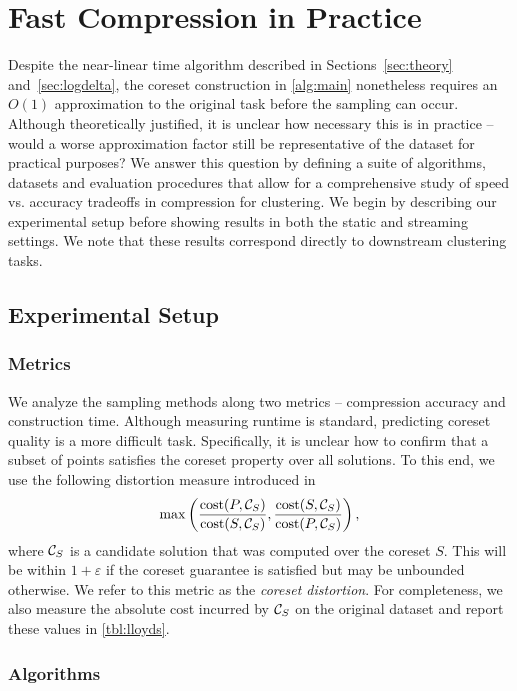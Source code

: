 \section{Fast Compression in Practice}

Despite the near-linear time algorithm described in Sections~\ref{sec:theory} and~\ref{sec:logdelta}, the coreset construction in \ref{alg:main} nonetheless
requires an $O(1)$ approximation to the original task before the sampling can occur. Although theoretically justified, it is unclear how necessary this is in
practice -- would a worse approximation factor still be representative of the dataset for practical purposes? We answer this question by defining a suite of
algorithms, datasets and evaluation procedures that allow for a comprehensive study of speed vs. accuracy tradeoffs in compression for clustering.  We begin by
describing our experimental setup before showing results in both the static and streaming settings.  We note that these results correspond directly to
downstream clustering tasks.

\subsection{Experimental Setup}
\subsubsection{Metrics}
\label{sssec:metrics}

We analyze the sampling methods along two metrics -- compression accuracy and construction time. Although measuring runtime is standard, predicting coreset
quality is a more difficult task. Specifically, it is unclear how to confirm that a subset of points satisfies the coreset property over all solutions. To this
end, we use the following distortion measure introduced in~\cite{chrisESA} \[ \max \left( \dfrac{\operatorname{cost}(P, \mathcal C_{S})}{\operatorname{cost}(S, \mathcal C_{S})}, \dfrac{\operatorname{cost}(S,
\mathcal C_{S})}{\operatorname{cost}(P, \mathcal C_{S})} \right),\] where $\mathcal C_{S}$ is a candidate solution that was computed over the coreset $S$. This
will be within $1+\varepsilon$ if the coreset guarantee is satisfied but may be unbounded otherwise.  We refer to this metric as the \emph{coreset distortion}.
For completeness, we also measure the absolute cost incurred by $\mathcal C_S$ on the original dataset and report these values in \cref{tbl:lloyds}.

\subsubsection{Algorithms}
\label{ssec:algorithms}

